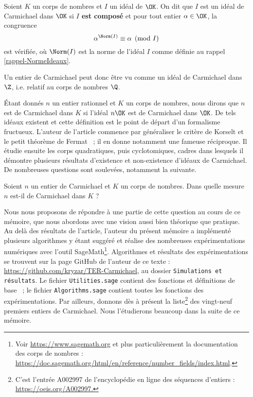 \begin{definition} Soient $K$ un corps de nombres et $I$ un idéal de $\OK$. On dit que $I$ est un idéal de Carmichael dans $\OK$ si \textbf{$I$ est composé} et pour tout entier $\alpha \in \OK$, la congruence \[\alpha^{\Norm(I)} \equiv \alpha \pmod{I}\] est vérifiée, où $\Norm(I)$ est la norme de l'idéal $I$ comme définie au rappel \ref{rappel-NormeIdeaux}.
\end{definition}

\begin{remarque}
	Un entier de Carmichael peut donc être vu comme un idéal de Carmichael dans $\Z$, i.e. relatif au corps de nombres $\Q$.
\end{remarque}

Étant donnés $n$ un entier rationnel et $K$ un corps de nombres, nous dirons que $n$ est de Carmichael dans $K$ si l'idéal $n\OK$ est de Carmichael dans $\OK$. De tels idéaux existent et cette définition est le point de départ d'un formalisme fructueux. L'auteur de l'article commence par généraliser le critère de Korselt et le petit théorème de Fermat ~; il en donne notamment une fameuse réciproque. Il étudie ensuite les corps quadratiques, puis cyclotomiques, cadres dans lesquels il démontre plusieurs résultats d'existence et non-existence d'idéaux de Carmichael. De nombreuses questions sont soulevées, notamment la suivante. 

\begin{question}\label{question-centrale}Soient $n$ un entier de Carmichael et $K$ un corps de nombres. Dans quelle mesure $n$ est-il de Carmichael dans $K$ ?
\end{question}

Nous nous proposons de répondre à une partie de cette question au cours de ce mémoire, que nous abordons avec une vision aussi bien théorique que pratique. Au delà des résultats de l'article, l'auteur du présent mémoire a implémenté plusieurs algorithmes y étant suggéré et réalise des nombreuses expérimentations numériques avec l'outil SageMath\footnote{Voir \url{https://www.sagemath.org} et plus particulièrement la documentation des corps de nombres : \url{https://doc.sagemath.org/html/en/reference/number\_fields/index.html}.}. Algorithmes et résultats des expérimentations se trouvent sur la page GitHub de l'auteur de ce texte : \url{https://github.com/kryzar/TER-Carmichael}, au dossier \texttt{Simulations et résultats}. Le fichier \texttt{Utilities.sage} contient des fonctions et définitions de base ~; le fichier \texttt{Algorithms.sage} contient toutes les fonctions des expérimentations. Par ailleurs, donnons dès à présent la liste\footnote{C’est l'entrée A002997 de l'encyclopédie en ligne des séquences d’entiers : \url{https://oeis.org/A002997.}} des vingt-neuf premiers entiers de Carmichael. Nous l'étudierons beaucoup dans la suite de ce mémoire.

